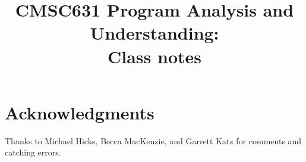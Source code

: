 \documentclass[11pt]{article}
\title{CMSC631 Program Analysis and Understanding:\\
  Class notes}
\begin{document}
\maketitle
\tableofcontents


\newpage


\newpage






\appendix
\section{Acknowledgments}

Thanks to Michael Hicks, Becca MacKenzie, and Garrett Katz for
comments and catching errors.
\end{document}
